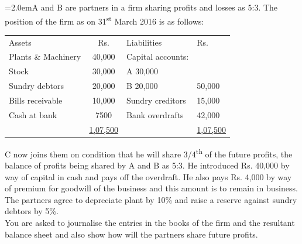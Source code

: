 \documentclass[11pt,a4paper]{article}
\newcommand{\lqn}[2]{\Needspace{6\baselineskip}\par\medskip\noindent\hangindent=2.0em\hangafter=1\makebox[2.0em][l]{\textbf{#1.}}#2\par}
\begin{document}
\lqn{91}{A and B are partners in a firm sharing profits and losses as 5:3. The position of the firm as on 31\textsuperscript{st} March 2016 is as follows:\par
\par\smallskip\noindent\hspace*{1.2em}\begin{tabular}{|lcll|}
\hline
Assets & Rs. & Liabilities & Rs. \\
Plants \& Machinery & 40,000 & Capital accounts: &  \\
Stock & 30,000 & A               30,000 &  \\
Sundry debtors & 20,000 & B               20,000 & 50,000 \\
Bills receivable & 10,000 & Sundry creditors & 15,000 \\
Cash at bank & 7500 & Bank overdrafts & 42,000 \\
 & \underline{1,07,500} &  & \underline{1,07,500} \\
\hline
\end{tabular}\par\smallskip
C now joins them on condition that he will share 3/4\textsuperscript{th}  of the future profits, the balance of profits being shared by A and B as 5:3. He introduced Rs. 40,000 by way of capital in cash and pays off the overdraft. He also pays Rs. 4,000 by way of premium for goodwill of the business and this amount is to remain in business. The partners agree to depreciate plant by 10\% and raise a reserve against sundry debtors by 5\%.\\
You are asked to journalise the entries in the books of the firm and the resultant balance sheet and also show how will the partners share future profits.\par
}
\end{document}
